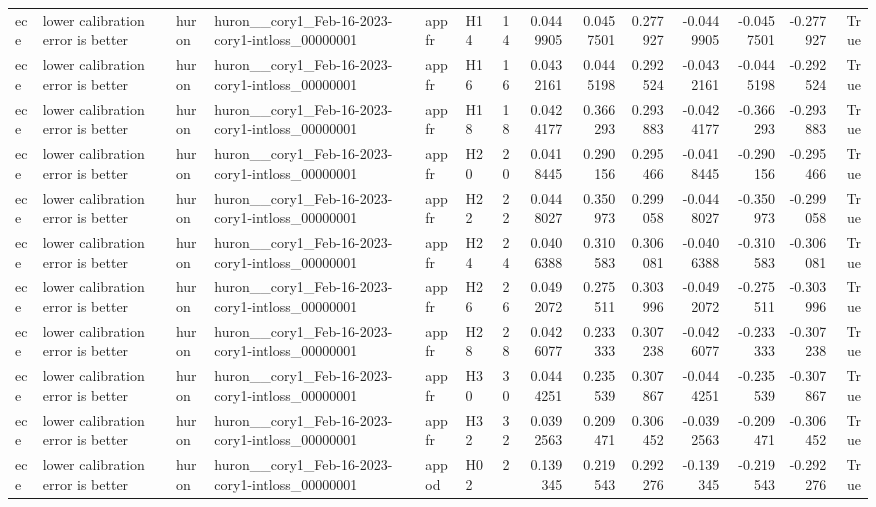 \begin{longtable}{llllllrrrrrrrr}
ece & lower calibration error is better & huron & huron\_\_cory1\_Feb-16-2023-cory1-intloss\_00000001 & appfr & H14 & 14 & 0.0449905 & 0.0457501 & 0.277927 & -0.0449905 & -0.0457501 & -0.277927 & True \\
ece & lower calibration error is better & huron & huron\_\_cory1\_Feb-16-2023-cory1-intloss\_00000001 & appfr & H16 & 16 & 0.0432161 & 0.0445198 & 0.292524 & -0.0432161 & -0.0445198 & -0.292524 & True \\
ece & lower calibration error is better & huron & huron\_\_cory1\_Feb-16-2023-cory1-intloss\_00000001 & appfr & H18 & 18 & 0.0424177 & 0.366293 & 0.293883 & -0.0424177 & -0.366293 & -0.293883 & True \\
ece & lower calibration error is better & huron & huron\_\_cory1\_Feb-16-2023-cory1-intloss\_00000001 & appfr & H20 & 20 & 0.0418445 & 0.290156 & 0.295466 & -0.0418445 & -0.290156 & -0.295466 & True \\
ece & lower calibration error is better & huron & huron\_\_cory1\_Feb-16-2023-cory1-intloss\_00000001 & appfr & H22 & 22 & 0.0448027 & 0.350973 & 0.299058 & -0.0448027 & -0.350973 & -0.299058 & True \\
ece & lower calibration error is better & huron & huron\_\_cory1\_Feb-16-2023-cory1-intloss\_00000001 & appfr & H24 & 24 & 0.0406388 & 0.310583 & 0.306081 & -0.0406388 & -0.310583 & -0.306081 & True \\
ece & lower calibration error is better & huron & huron\_\_cory1\_Feb-16-2023-cory1-intloss\_00000001 & appfr & H26 & 26 & 0.0492072 & 0.275511 & 0.303996 & -0.0492072 & -0.275511 & -0.303996 & True \\
ece & lower calibration error is better & huron & huron\_\_cory1\_Feb-16-2023-cory1-intloss\_00000001 & appfr & H28 & 28 & 0.0426077 & 0.233333 & 0.307238 & -0.0426077 & -0.233333 & -0.307238 & True \\
ece & lower calibration error is better & huron & huron\_\_cory1\_Feb-16-2023-cory1-intloss\_00000001 & appfr & H30 & 30 & 0.0444251 & 0.235539 & 0.307867 & -0.0444251 & -0.235539 & -0.307867 & True \\
ece & lower calibration error is better & huron & huron\_\_cory1\_Feb-16-2023-cory1-intloss\_00000001 & appfr & H32 & 32 & 0.0392563 & 0.209471 & 0.306452 & -0.0392563 & -0.209471 & -0.306452 & True \\
ece & lower calibration error is better & huron & huron\_\_cory1\_Feb-16-2023-cory1-intloss\_00000001 & appod & H02 & 2 & 0.139345 & 0.219543 & 0.292276 & -0.139345 & -0.219543 & -0.292276 & True \\

\end{longtable}
